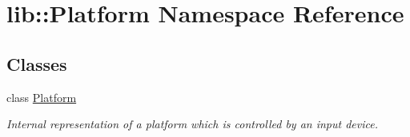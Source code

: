 \hypertarget{namespacelib_1_1Platform}{\section{lib\-:\-:\-Platform \-Namespace \-Reference}
\label{namespacelib_1_1Platform}
}
\subsection*{\-Classes}
\begin{DoxyCompactItemize}
\item 
class \hyperlink{classlib_1_1Platform_1_1Platform}{\-Platform}
\begin{DoxyCompactList}\small\item\em \-Internal representation of a platform which is controlled by an input device. \end{DoxyCompactList}\end{DoxyCompactItemize}
